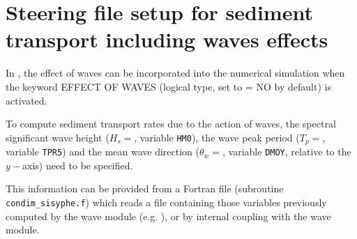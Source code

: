 \section{Steering file setup for sediment transport including waves effects}
In \sisyphe{}, the effect of waves can be incorporated into the numerical simulation when the keyword 
 {\ttfamily EFFECT OF WAVES} (logical type, set to {\ttfamily = NO} by default) is activated. 

 To compute sediment transport rates due to the action of waves, the spectral significant wave height ($H_s =$, variable \texttt{HM0}), the wave peak period ($T_p =$, variable \texttt{TPR5}) and the mean wave direction ($\theta_w =$, variable \texttt{DMOY}, relative to the $y-$axis) need to be specified.

 This information can be provided from a Fortran file (subroutine \texttt{condim\_sisyphe.f}) which reads a file containing those variables previously computed by the wave module (e.g. \tomawac{}), or by internal coupling with the wave module.
 
